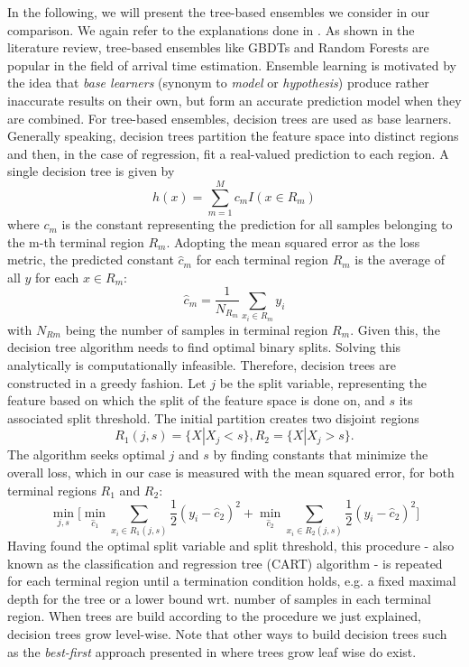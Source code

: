 In the following, we will present the tree-based ensembles we consider in our comparison. We again refer to the explanations done in \cite{friedman2001elements}.
As shown in the literature review, tree-based ensembles like GBDTs and Random Forests are popular in the field of arrival time estimation. Ensemble learning is motivated by the idea that \textit{base learners} (synonym to \textit{model} or \textit{hypothesis}) produce rather inaccurate results on their own, but form an accurate prediction model when they are combined. For tree-based ensembles, decision trees are used as base learners. 
Generally speaking, decision trees partition the feature space into distinct regions and then, in the case of regression, fit a real-valued prediction to each region. 
A single decision tree is given by
\begin{equation}
h(x) = \sum_{m=1}^{M} c_m I(x \in R_m)
\end{equation}
where $ c_m $ is the constant representing the prediction for all samples belonging to the m-th terminal region $ R_m $. Adopting the mean squared error as the loss metric, the predicted constant $ \hat{c}_m $ for each terminal region $ R_m $ is the average of all $ y $ for each $ x \in R_m $:
\begin{equation}
	\hat{c}_m =  \dfrac{1}{N_{R_m}}\sum_{x_i \in R_m}^{} y_i
\end{equation}
with $ N_{Rm} $ being the number of samples in terminal region $ R_m $. Given this, the decision tree algorithm needs to find optimal binary splits. Solving this analytically is computationally infeasible. Therefore, decision trees are constructed in a greedy fashion.
Let $ j $ be the split variable, representing the feature based on which the split of the feature space is done on, and $ s $ its associated split threshold.
The initial partition creates two disjoint regions
\begin{equation}
	R_1 (j,s) = \{X | X_j < s \}, R_{2} = \{X | X_j > s\}.
\end{equation}
The algorithm seeks optimal $ j $ and $ s $ by finding constants that minimize the overall loss, which in our case is measured with the mean squared error, for both terminal regions $ R_1 $ and $ R_2 $:
\begin{equation}\label{minjs}
	\min_{j,s} \bigg [\min_{\hat{c}_1} \sum_{x_i \in R_1(j,s)} \dfrac{1}{2}(y_i - \hat{c}_{2})^2 + \min_{\hat{c}_2} \sum_{x_i \in R_{2}(j,s)} \dfrac{1}{2}(y_i - \hat{c}_{2})^2\bigg]
\end{equation}
Having found the optimal split variable and split threshold, this procedure - also known as the classification and regression tree (CART) algorithm - is repeated for each terminal region until a termination condition holds, e.g. a fixed maximal depth for the tree or a lower bound wrt. number of samples in each terminal region. When trees are build according to the procedure we just explained, decision trees grow level-wise. Note that other ways to build decision trees such as the \textit{best-first} approach presented in \cite{BestFirst} where trees grow leaf wise do exist. 


